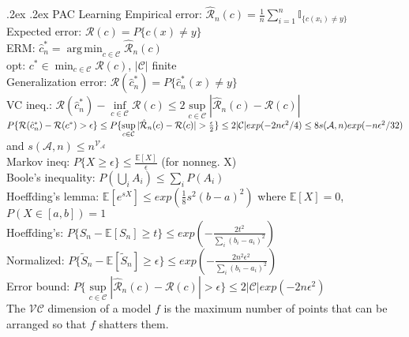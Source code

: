 \documentclass[11pt,landscape,a4paper,fleqn]{article}
\makeatletter
\renewcommand{\section}{\@startsection{section}{1}{0mm}%
                                {.2ex}%
                                {.2ex}%
	                                {\color{myred}\sffamily\small\bfseries}}
\DeclareMathOperator*{\argmin}{arg\,min}
\makeatother
\begin{document}
\begin{multicols*}{4}
\section{PAC Learning}
Empirical error: $\hat{\mathcal{R}}_n(c) = \tfrac{1}{n}\sum_{i=1}^n \mathbb{I}_{\{c(x_i)\neq y\}}$ \\
Expected error: $\mathcal{R}(c) = P\{c(x)\neq y\}$ \\
ERM: $\hat{c}_n^* = \argmin_{c\in\mathcal{C}} \hat{\mathcal{R}}_n(c)$ \\
opt: $c^* \in \min_{c\in\mathcal{C}} \mathcal{R}(c)$, $|\mathcal{C}|$ finite \\
Generalization error: $\mathcal{R}(\hat{c}_n^*) = P\{ \hat{c}_n^*(x)\neq y \}$ \\
VC ineq.: $\mathcal{R}(\hat{c}_n^*) - \inf\limits_{c\in\mathcal{C}}\mathcal{R}(c) \leq 2\sup\limits_{c\in\mathcal{C}}|\hat{\mathcal{R}}_n(c) - \mathcal{R}(c)|$ \\ 
$P\{ \mathcal{R}(\hat{c}_n^*) - \mathcal{R}(c^*) > \epsilon \} \leq P\{ \sup\limits_{c\in\mathcal{C}}|\hat{\mathcal{R}}_n(c) - \mathcal{R}(c)| > \frac{\epsilon}{2} \} \\
\leq 2|\mathcal{C}| exp(-2n\epsilon ^2 /4) \leq 8s(\mathcal{A},n)exp(-n\epsilon ^{2} /32)$ and $s(\mathcal{A},n) \leq n^{\mathcal{V_{\mathcal{A}}}}$ \\
Markov ineq: $P\{X\geq\epsilon\} \leq \tfrac{\mathbb{E}[X]}{\epsilon}$ (for nonneg. X) \\
Boole's inequality: $P(\bigcup_i A_i) \leq \sum_i P(A_i)$ \\
Hoeffding's lemma: $\mathbb{E}[e^{sX}] \leq exp(\tfrac{1}{8}s^2(b-a)^2)$ where $\mathbb{E}[X]=0$, $P(X\in[a,b])=1$ \\
Hoeffding's: $P\{S_n {-} \mathbb{E}[S_n] {\geq} t\} {\leq} exp({-} \frac{2t^2}{\sum_i (b_i - a_i)^2})$ \\
Normalized: $P\{\widetilde{S}_n {-} \mathbb{E}[\widetilde{S}_n] {\geq} \epsilon\} {\leq} exp({-} \frac{2n^2 \epsilon ^2}{\sum_i (b_i {-} a_i)^2})$ \\
{\small Error bound: $P\{ \sup\limits_{c\in\mathcal{C}}|\hat{\mathcal{R}}_n(c) - \mathcal{R}(c)| > \epsilon \} \leq 2|\mathcal{C}| exp(-2n\epsilon ^2)$} \\
The $\mathcal{VC}$ dimension of a model $f$ is the maximum number of points that can be arranged so that $f$ shatters them.


\end{multicols*}
\end{document}

